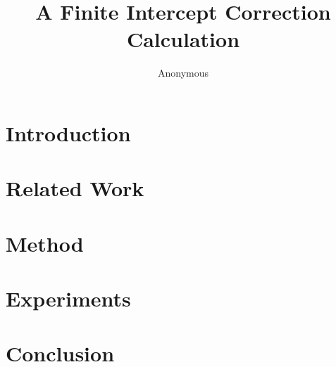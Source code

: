 \documentclass[11pt]{article}
\title{A Finite Intercept Correction Calculation}
\author{Anonymous}
\date{}
\begin{document}
\maketitle
\begin{abstract}
\end{abstract}
\section{Introduction}
\section{Related Work}
\section{Method}
\section{Experiments}
\section{Conclusion}


\end{document}
